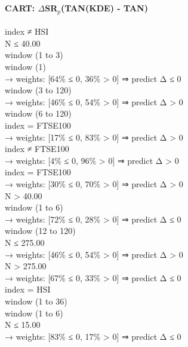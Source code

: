 \
\paragraph{CART: $\Delta$SR$_p$(TAN(KDE) - TAN)}

\begin{flushleft}
\ttfamily %
index ≠ HSI \\
\quad N ≤ 40.00 \\
\quad \quad window (1 to 3) \\
\quad \quad \quad window (1) \\
\quad \quad \quad \quad → weights: [64\% ≤ 0, 36\% > 0] ⇒ predict Δ ≤ 0 \\
\quad \quad \quad window (3 to 120) \\
\quad \quad \quad \quad → weights: [46\% ≤ 0, 54\% > 0] ⇒ predict Δ > 0 \\
\quad \quad window (6 to 120) \\
\quad \quad \quad index = FTSE100 \\
\quad \quad \quad \quad → weights: [17\% ≤ 0, 83\% > 0] ⇒ predict Δ > 0 \\
\quad \quad \quad index ≠ FTSE100 \\
\quad \quad \quad \quad → weights: [4\% ≤ 0, 96\% > 0] ⇒ predict Δ > 0 \\
\quad \quad \quad index = FTSE100 \\
\quad \quad \quad \quad → weights: [30\% ≤ 0, 70\% > 0] ⇒ predict Δ > 0 \\
\quad N > 40.00 \\
\quad \quad window (1 to 6) \\
\quad \quad \quad \quad → weights: [72\% ≤ 0, 28\% > 0] ⇒ predict Δ ≤ 0 \\
\quad \quad window (12 to 120) \\
\quad \quad \quad N ≤ 275.00 \\
\quad \quad \quad \quad → weights: [46\% ≤ 0, 54\% > 0] ⇒ predict Δ > 0 \\
\quad \quad \quad N > 275.00 \\
\quad \quad \quad \quad → weights: [67\% ≤ 0, 33\% > 0] ⇒ predict Δ ≤ 0 \\
index = HSI \\
\quad window (1 to 36) \\
\quad \quad window (1 to 6) \\
\quad \quad \quad N ≤ 15.00 \\
\quad \quad \quad \quad → weights: [83\% ≤ 0, 17\% > 0] ⇒ predict Δ ≤ 0 \\

\end{flushleft}
